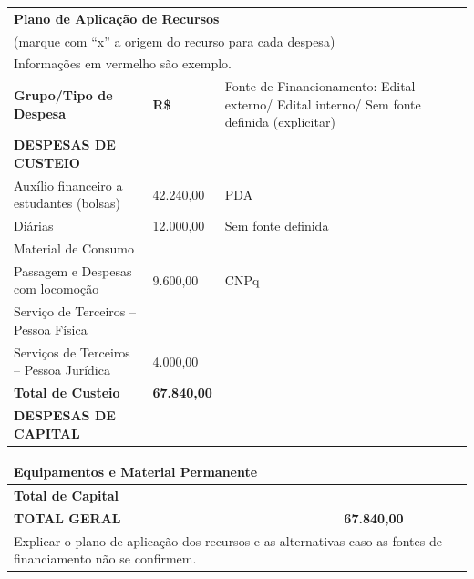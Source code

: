 \documentclass[
  12pt,				
  openright,	
  twoside,	
  a4paper,
  brazil,	
  oldfontcommands,
  ]{abntex2}
\begin{document}
\begin{table}[H]
\begin{center}
    \begin{tabularx}{\textwidth}{|X|p{2cm}|p{6cm}|}
        \multicolumn{3}{l}{\textbf{Plano de Aplica\c{c}\~{a}o de Recursos}} \\
        \multicolumn{3}{l}{\footnotesize (marque com ``x'' a origem do recurso para cada despesa)} \\
        \multicolumn{3}{l}{\footnotesize \color{red} Informa\c{c}\~{o}es em vermelho s\~{a}o exemplo.} \\
\hline
\cellcolor{green} \textbf{Grupo/Tipo de Despesa} &\cellcolor{green}  \textbf{R\$} & \cellcolor{green}  Fonte de Financionamento: {\tiny Edital externo/ Edital interno/ Sem fonte definida (explicitar)} \\\hline
\textbf{DESPESAS DE CUSTEIO} & & \\\hline
Aux\'{i}lio financeiro a estudantes (bolsas) & 42.240,00 & PDA \\\hline
Di\'{a}rias & 12.000,00 & Sem fonte definida \\\hline
Material de Consumo &  & \\\hline
Passagem e Despesas com locomo\c{c}\~{a}o & 9.600,00 & CNPq \\\hline
Servi\c{c}o de Terceiros -- Pessoa F\'{i}sica & & \\\hline
Servi\c{c}os de Terceiros -- Pessoa Jur\'{i}dica & 4.000,00 & \\\hline
\cellcolor{green} \hfill \textbf{Total de Custeio} & \cellcolor{green} \textbf{67.840,00} &\cellcolor{green}  \\\hline
\textbf{DESPESAS DE CAPITAL} & & \\\hline
\end{tabularx}
\end{center}
\end{table}
\vspace{-10mm}

\begin{table}[H]
\begin{center}
    \begin{tabularx}{\textwidth}{|X|p{2cm}|p{6cm}|}
\hline
Equipamentos e Material Permanente &  &  \\\hline
\cellcolor{green} \hfill \textbf{Total de Capital} & \cellcolor{green}  & \cellcolor{green} \\\hline
\cellcolor{green} \hfill \textbf{TOTAL GERAL} &\cellcolor{green}  \textbf{67.840,00} &\cellcolor{green}  \\\hline
\multicolumn{3}{l}{\footnotesize \color{red}
    Explicar o plano de aplica\c{c}\~{a}o dos recursos e as alternativas caso as fontes de financiamento n\~{a}o se confirmem.
}
\end{tabularx}
\end{center}
\end{table}
\vspace{-10mm}
\end{document}
